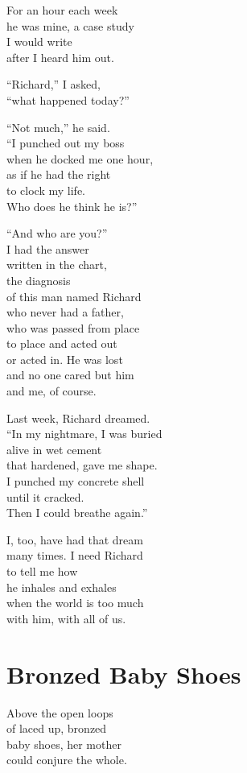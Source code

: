 \documentclass[twoside,10pt]{book}
\begin{document}
For an hour each week\\
he was mine, a case study\\
I would write\\
after I heard him out.

``Richard,'' I asked,\\
``what happened today?''

``Not much,'' he said.\\
``I punched out my boss\\
when he docked me one hour,\\
as if he had the right\\
to clock my life.\\
Who does he think he is?''

``And who are you?''\\
I had the answer\\
written in the chart,\\
the diagnosis\\
of this man named Richard\\
who never had a father,\\
who was passed from place\\
to place and acted out\\
or acted in. He was lost\\
and no one cared but him\\
and me, of course.

Last week, Richard dreamed.\\
``In my nightmare, I was buried\\
alive in wet cement\\
that hardened, gave me shape.\\
I punched my concrete shell\\
until it cracked.\\
Then I could breathe again.''

I, too, have had that dream\\
many times. I need Richard\\
to tell me how\\
he inhales and exhales\\
when the world is too much\\
with him, with all of us.


\clearpage
\section{Bronzed Baby Shoes}

Above the open loops\\
of laced up, bronzed\\
baby shoes, her mother\\
could conjure the whole.
\end{document}
